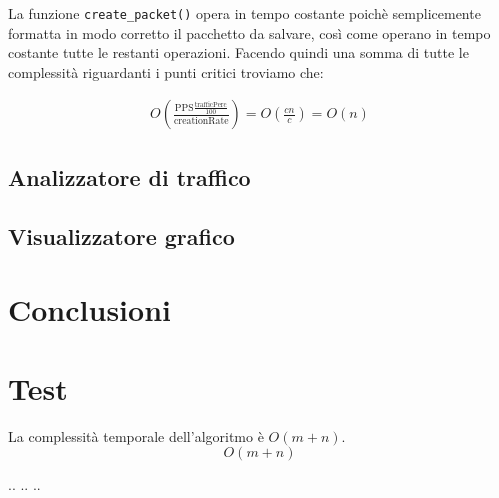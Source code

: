 \documentclass[binding=0.6cm]{sapthesis}
\begin{document}
La funzione \lstinline|create_packet()| opera in tempo costante poichè semplicemente formatta in modo corretto il pacchetto da salvare, così come operano in tempo costante tutte le restanti operazioni.
Facendo quindi una somma di tutte le complessità riguardanti i punti critici troviamo che:

\begin{align}
    O(\frac{\text{PPS}\frac{\text{trafficPerc}}{100}}{\text{creationRate}}) = O(\frac{cn}{c}) = O(n)
    \label{packets_per_fractional_time}
\end{align}



\section{Analizzatore di traffico}
\section{Visualizzatore grafico}




\chapter{Conclusioni}
\chapter{Test}
La complessità temporale dell'algoritmo è $O(m+n)$.
\begin{equation}
    O(m+n)
\end{equation}

.. .. ..


\printbibliography

\backmatter
\cleardoublepage
{} %
\end{document}
